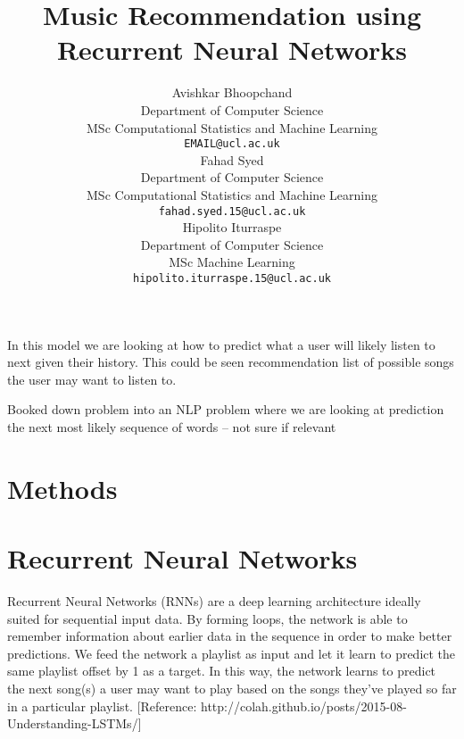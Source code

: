 \documentclass{article} %
\title{Music Recommendation using Recurrent Neural Networks}
\author{
Avishkar Bhoopchand\\
Department of Computer Science\\
MSc Computational Statistics and Machine Learning\\
\texttt{EMAIL@ucl.ac.uk} \\
\And
Fahad Syed\\
Department of Computer Science\\
MSc Computational Statistics and Machine Learning\\
\texttt{fahad.syed.15@ucl.ac.uk} \\
\And
Hipolito Iturraspe\\
Department of Computer Science\\
MSc Machine Learning\\
\texttt{hipolito.iturraspe.15@ucl.ac.uk} \\
}
\begin{document}
\maketitle
\clearpage

In this model we are looking at how to predict what a user will likely listen to next given their history. This could be seen recommendation list of possible songs the user may want to listen to.

Booked down problem into an NLP problem where we are looking at prediction the next most likely sequence of words – not sure if relevant 


%



\section{Methods}
\section{Recurrent Neural Networks}
Recurrent Neural Networks (RNNs) are a deep learning architecture ideally suited for sequential input data. By forming loops, the network is able to remember information about earlier data in the sequence in order to make better predictions. We feed the network a playlist as input and let it learn to predict the same playlist offset by 1 as a target. In this way, the network learns to predict the next song(s) a user may want to play based on the songs they've played so far in a particular playlist. [Reference: http://colah.github.io/posts/2015-08-Understanding-LSTMs/]
\end{document}
